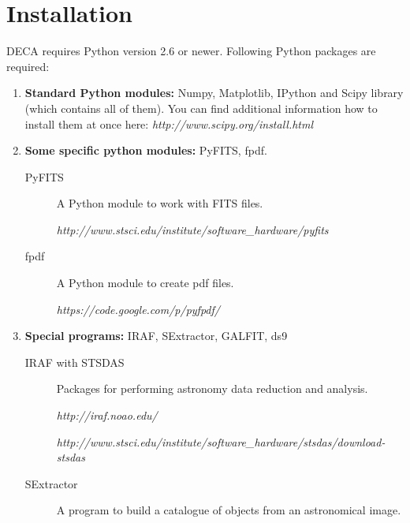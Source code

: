 \documentclass[
aps,%
12pt,%
final,%
notitlepage,%
oneside,%
onecolumn,%
nobibnotes,%
nofootinbib,%
superscriptaddress,%
noshowpacs,%
centertags]%
{revtex4}
\begin{document}
\section{Installation}

DECA requires Python version 2.6 or newer. Following Python packages are required:
\begin{enumerate}
 \item \textbf{Standard Python modules:} Numpy, Matplotlib, IPython and Scipy library (which contains all of them). You can find additional information how to install them at once here:
	\textit{ http://www.scipy.org/install.html}

 \item \textbf{Some specific python modules:} PyFITS, fpdf.
 \begin{description}
	\item[PyFITS] A Python module to work with FITS files. 

		\textit{http://www.stsci.edu/institute/software\_hardware/pyfits}

	\item[fpdf] A Python module to create pdf files.  

		\textit{https://code.google.com/p/pyfpdf/}
 \end{description}



 \item \textbf{Special programs:} IRAF, SExtractor, GALFIT, ds9
  \begin{description}
   \item[IRAF with STSDAS] Packages for performing astronomy data reduction and analysis.

  	 \textit{http://iraf.noao.edu/}

  	 \textit{http://www.stsci.edu/institute/software\_hardware/stsdas/download-stsdas}

   \item[SExtractor] A program to build a catalogue of objects from an astronomical image.


\end{description}
\end{enumerate}
\end{document}
